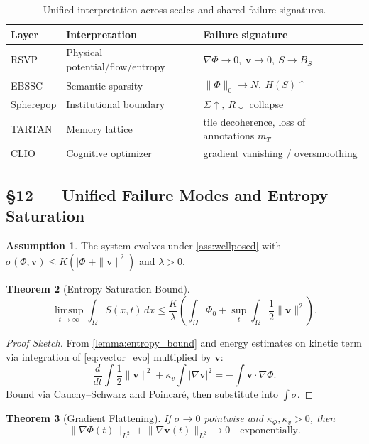 \documentclass[11pt]{article}
\newtheorem{theorem}{Theorem}[section]
\theoremstyle{definition}
\newtheorem{assumption}[theorem]{Assumption}
\theoremstyle{remark}
\newcommand{\vect}[1]{\bm{#1}}
\newcommand{\norm}[1]{\lVert #1\rVert}
\begin{document}
\begin{table}[H]
\centering
\begin{tabular}{lll}
\toprule
Layer & Interpretation & Failure signature \\
\midrule
RSVP & Physical potential/flow/entropy & $\nabla\Phi\to0,\ \vect{v}\to0,\ S\to B_S$ \\
EBSSC & Semantic sparsity & $\|\Phi\|_0\to N,\ H(S)\uparrow$ \\
Spherepop & Institutional boundary & $\Sigma\!\uparrow,\ R\!\downarrow$ collapse \\
TARTAN & Memory lattice & tile decoherence, loss of annotations $m_T$ \\
CLIO & Cognitive optimizer & gradient vanishing / oversmoothing \\
\bottomrule
\end{tabular}
\caption{Unified interpretation across scales and shared failure signatures.}
\end{table}

\subsection*{§12 — Unified Failure Modes and Entropy Saturation}

\begin{assumption}
\label{ass:failure}
The system evolves under \cref{ass:wellposed} with $\sigma(\Phi,\vect{v}) \le K (|\Phi| + \|\vect{v}\|^2)$ and $\lambda > 0$.
\end{assumption}

\begin{theorem}[Entropy Saturation Bound]
\[
\limsup_{t \to \infty} \int_\Omega S(x,t)\,dx \le \frac{K}{\lambda} \left( \int_\Omega \Phi_0 + \sup_t \int_\Omega \frac{1}{2} \|\vect{v}\|^2 \right).
\]
\end{theorem}

\begin{proof}[Proof Sketch]
From \cref{lemma:entropy_bound} and energy estimates on kinetic term via integration of \eqref{eq:vector_evo} multiplied by $\vect{v}$:
\[
\frac{d}{dt} \int \frac{1}{2} \|\vect{v}\|^2 + \kappa_v \int |\nabla \vect{v}|^2 = -\int \vect{v} \cdot \nabla \Phi.
\]
Bound via Cauchy--Schwarz and Poincaré, then substitute into $\int \sigma$.
\end{proof}

\begin{theorem}[Gradient Flattening]
If $\sigma \to 0$ pointwise and $\kappa_\Phi, \kappa_v > 0$, then
\[
\norm{\nabla \Phi(t)}_{L^2} + \norm{\nabla \vect{v}(t)}_{L^2} \to 0 \quad \text{exponentially}.
\]
\end{theorem}
\end{document}

